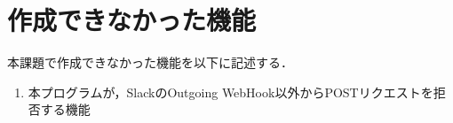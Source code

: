\documentclass[12pt]{jsarticle}
\begin{document}
\section{作成できなかった機能}
本課題で作成できなかった機能を以下に記述する．
\begin{enumerate}
\item 本プログラムが，SlackのOutgoing WebHook以外からPOSTリクエストを拒否する機能

  
\end{enumerate}






\end{document}
